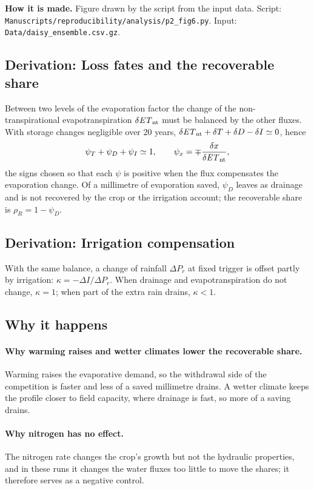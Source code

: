 \textbf{How it is made.} Figure drawn by the script from the input data. Script: \nolinkurl{Manuscripts/reproducibility/analysis/p2_fig6.py}. Input: \nolinkurl{Data/daisy_ensemble.csv.gz}.


\subsection{Derivation: Loss fates and the recoverable share}\label{der:s1:4}
Between two levels of the evaporation factor the change of the non-transpirational evapotranspiration $\delta\mathit{ET}_{\mathrm{nt}}$ must be balanced by the other fluxes. With storage changes negligible over 20 years, $\delta\mathit{ET}_{\mathrm{nt}}+\delta T+\delta D-\delta I\simeq0$, hence
\begin{equation}\psi_T+\psi_D+\psi_I\simeq1,\qquad \psi_x=\mp\frac{\delta x}{\delta\mathit{ET}_{\mathrm{nt}}},\end{equation}
the signs chosen so that each $\psi$ is positive when the flux compensates the evaporation change. Of a millimetre of evaporation saved, $\psi_D$ leaves as drainage and is not recovered by the crop or the irrigation account; the recoverable share is $\rho_R=1-\psi_D$.


\subsection{Derivation: Irrigation compensation}\label{der:s1:9}
With the same balance, a change of rainfall $\Delta P_r$ at fixed trigger is offset partly by irrigation: $\kappa=-\Delta I/\Delta P_r$. When drainage and evapotranspiration do not change, $\kappa=1$; when part of the extra rain drains, $\kappa<1$.


\subsection{Why it happens}
\paragraph{Why warming raises and wetter climates lower the recoverable share.} Warming raises the evaporative demand, so the withdrawal side of the competition is faster and less of a saved millimetre drains. A wetter climate keeps the profile closer to field capacity, where drainage is fast, so more of a saving drains.

\paragraph{Why nitrogen has no effect.} The nitrogen rate changes the crop's growth but not the hydraulic properties, and in these runs it changes the water fluxes too little to move the shares; it therefore serves as a negative control.

